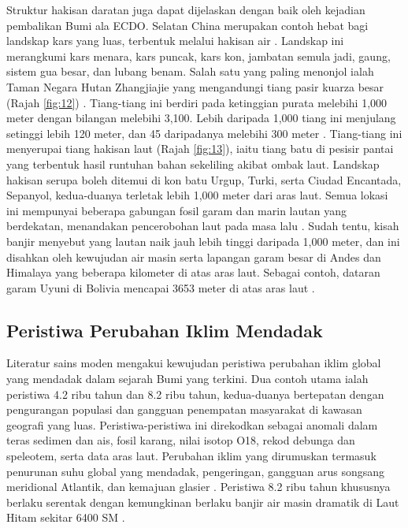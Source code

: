 \documentclass[10pt,twocolumn,letterpaper]{article}
\begin{document}
Struktur hakisan daratan juga dapat dijelaskan dengan baik oleh kejadian pembalikan Bumi ala ECDO. Selatan China merupakan contoh hebat bagi landskap kars yang luas, terbentuk melalui hakisan air \cite{82}. Landskap ini merangkumi kars menara, kars puncak, kars kon, jambatan semula jadi, gaung, sistem gua besar, dan lubang benam. Salah satu yang paling menonjol ialah Taman Negara Hutan Zhangjiajie yang mengandungi tiang pasir kuarza besar (Rajah \ref{fig:12}) \cite{84}. Tiang-tiang ini berdiri pada ketinggian purata melebihi 1,000 meter dengan bilangan melebihi 3,100. Lebih daripada 1,000 tiang ini menjulang setinggi lebih 120 meter, dan 45 daripadanya melebihi 300 meter \cite{85}. Tiang-tiang ini menyerupai tiang hakisan laut (Rajah \ref{fig:13}), iaitu tiang batu di pesisir pantai yang terbentuk hasil runtuhan bahan sekeliling akibat ombak laut. Landskap hakisan serupa boleh ditemui di kon batu Urgup, Turki, serta Ciudad Encantada, Sepanyol, kedua-duanya terletak lebih 1,000 meter dari aras laut. Semua lokasi ini mempunyai beberapa gabungan fosil garam dan marin lautan yang berdekatan, menandakan pencerobohan laut pada masa lalu \cite{15,86,87}. Sudah tentu, kisah banjir \cite{3} menyebut yang lautan naik jauh lebih tinggi daripada 1,000 meter, dan ini disahkan oleh kewujudan air masin serta lapangan garam besar di Andes dan Himalaya yang beberapa kilometer di atas aras laut. Sebagai contoh, dataran garam Uyuni di Bolivia mencapai 3653 meter di atas aras laut \cite{94}.

\subsection{Peristiwa Perubahan Iklim Mendadak}

Literatur sains moden mengakui kewujudan peristiwa perubahan iklim global yang mendadak dalam sejarah Bumi yang terkini. Dua contoh utama ialah peristiwa 4.2 ribu tahun dan 8.2 ribu tahun, kedua-duanya bertepatan dengan pengurangan populasi dan gangguan penempatan masyarakat di kawasan geografi yang luas. Peristiwa-peristiwa ini direkodkan sebagai anomali dalam teras sedimen dan ais, fosil karang, nilai isotop O18, rekod debunga dan speleotem, serta data aras laut. Perubahan iklim yang dirumuskan termasuk penurunan suhu global yang mendadak, pengeringan, gangguan arus songsang meridional Atlantik, dan kemajuan glasier \cite{90,91,92}. Peristiwa 8.2 ribu tahun khususnya berlaku serentak dengan kemungkinan berlaku banjir air masin dramatik di Laut Hitam sekitar 6400 SM \cite{93}.
\end{document}

